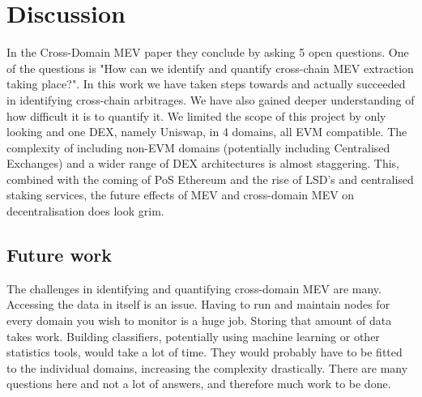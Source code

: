 \chapter{Discussion}
\label{Sec:Discussion}

In the Cross-Domain MEV paper \cite{crossdomainMEV} they conclude by asking 5 open questions. One of the questions is "How can we identify and quantify cross-chain MEV extraction taking place?". In this work we have taken steps towards and actually succeeded in identifying cross-chain arbitrages. We have also gained deeper understanding of how difficult it is to quantify it. We limited the scope of this project by only looking and one DEX, namely Uniswap, in 4 domains, all EVM compatible. The complexity of including non-EVM domains (potentially including Centralised Exchanges) and a wider range of DEX architectures is almost staggering. This, combined with the coming of PoS Ethereum and the rise of LSD's and centralised staking services, the future effects of MEV and cross-domain MEV on decentralisation does look grim. 

\section{Future work}

The challenges in identifying and quantifying cross-domain MEV are many. Accessing the data in itself is an issue. Having to run and maintain nodes for every domain you wish to monitor is a huge job. Storing that amount of data takes work. Building classifiers, potentially using machine learning or other statistics tools, would take a lot of time. They would probably have to be fitted to the individual domains, increasing the complexity drastically. There are many questions here and not a lot of answers, and therefore much work to be done.  





